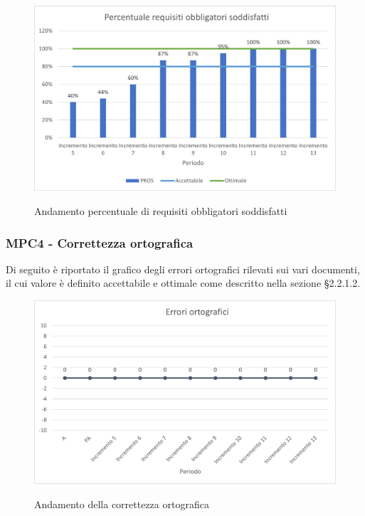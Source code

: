 \begin{figure}[H]
\centering
\includegraphics[scale=0.78]{res/ResocontoAttivitaDiVerifica/res/metriche/grafici/img/PROS.png}\\
\caption{Andamento percentuale di requisiti obbligatori soddisfatti}
\end{figure}



\subsubsection{MPC4 - Correttezza ortografica}
Di seguito è riportato il grafico degli errori ortografici rilevati sui vari documenti, il cui valore è definito accettabile e ottimale come descritto nella sezione §2.2.1.2.\\

\begin{figure}[H]
\centering
\includegraphics[scale=0.78]{res/ResocontoAttivitaDiVerifica/res/metriche/grafici/img/correttezzaOrtografica.png}\\
\caption{Andamento della correttezza ortografica}
\end{figure}

